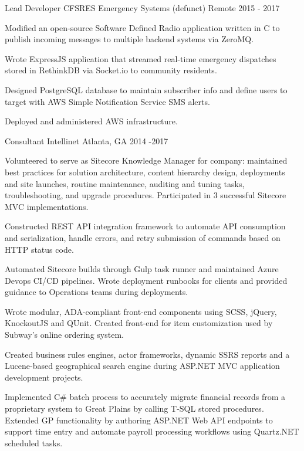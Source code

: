 \begin{cventries}
  \cventry
    {Lead Developer} %
    {CFSRES Emergency Systems (defunct)} %
    {Remote} %
    {2015 - 2017} %
    {
      \begin{cvitems} %
        \item {Modified an open-source Software Defined Radio application written in C to publish incoming messages to multiple backend systems via ZeroMQ.}
        \item {Wrote ExpressJS application that streamed real-time emergency dispatches stored in RethinkDB via Socket.io to community residents.}
        \item {Designed PostgreSQL database to maintain subscriber info and define users to target with AWS Simple Notification Service SMS alerts.}
        \item {Deployed and administered AWS infrastructure.}
      \end{cvitems}
    }

  \cventry
    {Consultant} %
    {Intellinet} %
    {Atlanta, GA} %
    {2014 -2017 } %
    {
      \begin{cvitems} %
        \item {Volunteered to serve as Sitecore Knowledge Manager for company: maintained best practices for solution architecture, content hierarchy design, deployments and site launches, routine maintenance, auditing and tuning tasks, troubleshooting, and upgrade procedures. Participated in 3 successful Sitecore MVC implementations.}
		\item {Constructed REST API integration framework to automate API consumption and serialization, handle errors, and retry submission of commands based on HTTP status code.}
		\item {Automated Sitecore builds through Gulp task runner and maintained Azure Devops CI/CD pipelines. Wrote deployment runbooks for clients and provided guidance to Operations teams during deployments.}
		\item {Wrote modular, ADA-compliant front-end components using SCSS, jQuery, KnockoutJS and QUnit. Created front-end for item customization used by Subway’s online ordering system.}
		\item {Created business rules engines, actor frameworks, dynamic SSRS reports and a Lucene-based geographical search engine during ASP.NET MVC application development projects.}
		\item {Implemented C\# batch process to accurately migrate financial records from a proprietary system to Great Plains by calling T-SQL stored procedures. Extended GP functionality by authoring ASP.NET Web API endpoints to support time entry and automate payroll processing workflows using Quartz.NET scheduled tasks.}
      \end{cvitems}
    }


\end{cventries}
